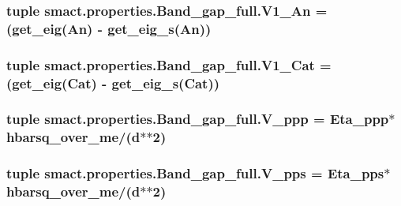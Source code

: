 \subsubsection[{V1\+\_\+\+An}]{\setlength{\rightskip}{0pt plus 5cm}tuple smact.\+properties.\+Band\+\_\+gap\+\_\+full.\+V1\+\_\+\+An = (get\+\_\+eig({\bf An}) -\/ get\+\_\+eig\+\_\+s({\bf An}))}\label{namespacesmact_1_1properties_1_1_band__gap__full_a9e4c108874da73398eddac35593e8d6e}
\hypertarget{namespacesmact_1_1properties_1_1_band__gap__full_a2294208fd4a873e16824e061265bb3d5}{}
\subsubsection[{V1\+\_\+\+Cat}]{\setlength{\rightskip}{0pt plus 5cm}tuple smact.\+properties.\+Band\+\_\+gap\+\_\+full.\+V1\+\_\+\+Cat = (get\+\_\+eig({\bf Cat}) -\/ get\+\_\+eig\+\_\+s({\bf Cat}))}\label{namespacesmact_1_1properties_1_1_band__gap__full_a2294208fd4a873e16824e061265bb3d5}
\hypertarget{namespacesmact_1_1properties_1_1_band__gap__full_a94465a48413ace032f1f279839a9e298}{}
\subsubsection[{V\+\_\+ppp}]{\setlength{\rightskip}{0pt plus 5cm}tuple smact.\+properties.\+Band\+\_\+gap\+\_\+full.\+V\+\_\+ppp = {\bf Eta\+\_\+ppp}$\ast${\bf hbarsq\+\_\+over\+\_\+me}/({\bf d}$\ast$$\ast$2)}\label{namespacesmact_1_1properties_1_1_band__gap__full_a94465a48413ace032f1f279839a9e298}
\hypertarget{namespacesmact_1_1properties_1_1_band__gap__full_a4ffc84c605d6f8d3bded071f75548506}{}
\subsubsection[{V\+\_\+pps}]{\setlength{\rightskip}{0pt plus 5cm}tuple smact.\+properties.\+Band\+\_\+gap\+\_\+full.\+V\+\_\+pps = {\bf Eta\+\_\+pps}$\ast${\bf hbarsq\+\_\+over\+\_\+me}/({\bf d}$\ast$$\ast$2)}\label{namespacesmact_1_1properties_1_1_band__gap__full_a4ffc84c605d6f8d3bded071f75548506}
\hypertarget{namespacesmact_1_1properties_1_1_band__gap__full_a69ae1b4a5da471226913ce16b15392f3}{}
